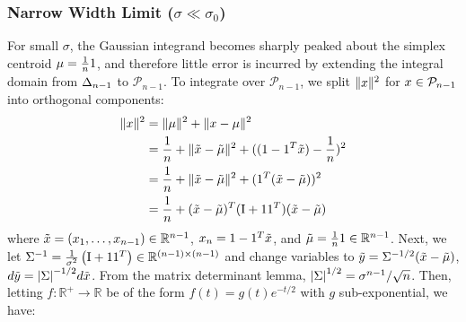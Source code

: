 \subsubsection{Narrow Width Limit ($\sigma \ll \sigma_0$)}

For small $\sigma$, the Gaussian integrand becomes sharply peaked about the simplex centroid $\mu = \frac{1}{n} \mathrm{1}$, and therefore little error is incurred by extending the integral domain from $\Delta_{n-1}$ to $\mathcal{P}_{n-1}$.
To integrate over $\mathcal{P}_{n-1}$, we split $\lVert x \rVert^2$ for $x \in \mathcal{P}_{n-1}$ into orthogonal components:
\begin{align*}
    \lVert x \rVert^2
     & = \lVert \mu \rVert^2 + \lVert x - \mu \rVert^2                                                     \\
     & = \frac{1}{n} + \lVert \tilde{x} - \tilde{\mu} \rVert^2 + ((1 - \mathrm{1}^T \tilde{x}) - \frac{1}{n})^2   \\
     & = \frac{1}{n} + \lVert \tilde{x} - \tilde{\mu} \rVert^2 + (\mathrm{1}^T (\tilde{x} - \tilde{\mu}))^2 \\
     & = \frac{1}{n} + (\tilde{x} - \tilde{\mu})^T (\mathrm{I} + \mathrm{1} \mathrm{1}^T) (\tilde{x} - \tilde{\mu})
\end{align*}
where $\tilde{x} = (x_{1}, \ldots, x_{n-1}) \in \mathbb{R}^{n-1}$, $x_n = 1 - \mathrm{1}^T \tilde{x}$, and $\tilde{\mu} = \frac{1}{n} \mathrm{1} \in \mathbb{R}^{n-1}$.
Next, we let $\Sigma^{-1} = \frac{1}{\sigma^2} \left( \mathrm{I} + \mathrm{1} \mathrm{1}^T \right) \in \mathbb{R}^{(n-1) \times (n-1)}$ and change variables to $\tilde{y} = \Sigma^{-1/2} (\tilde{x} - \tilde{\mu})$, $d \tilde{\vv{y}} = \AbsDet{\vv{\Sigma}}^{-1/2} d \tilde{\vv{x}}$.
From the matrix determinant lemma, $\left\lvert\Sigma\right\rvert^{1/2} = \sigma^{n-1} / \sqrt{n}$.
Then, letting $f : \mathbb{R}^+ \to \mathbb{R}$ be of the form $f(t) = g(t) e^{-t/2}$ with $g$ sub-exponential, we have:
